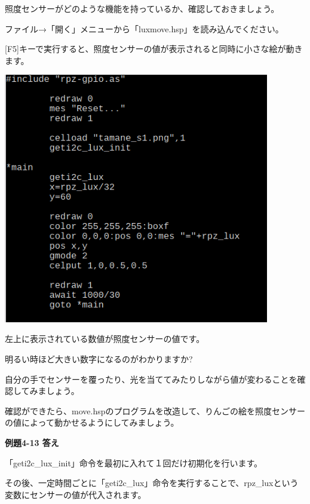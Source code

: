 \documentclass[a4paper,12pt]{jarticle}
\begin{document}
照度センサーがどのような機能を持っているか、確認しておきましょう。


\bigskip

ファイル→「開く」メニューから「luxmove.hsp」を読み込んでください。

[F5]キーで実行すると、照度センサーの値が表示されると同時に小さな絵が動きます。

\bigskip
\bigskip

\begin{minipage}{9.781cm}
\centering
{\upshape
\includegraphics[keepaspectratio,width=11.615cm,height=10.94cm]{text04-img/text04-img040.png}}
\end{minipage}

\bigskip
\bigskip
\bigskip

左上に表示されている数値が照度センサーの値です。

明るい時ほど大きい数字になるのがわかりますか?

自分の手でセンサーを覆ったり、光を当ててみたりしながら値が変わることを確認してみましょう。


\bigskip

確認ができたら、move.hspのプログラムを改造して、りんごの絵を照度センサーの値によって動かせるようにしてみましょう。


\bigskip

{\bfseries
例題4-13 答え}


\bigskip

「geti2c\_lux\_init」命令を最初に入れて１回だけ初期化を行います。

その後、一定時間ごとに「geti2c\_lux」命令を実行することで、rpz\_luxという変数にセンサーの値が代入されます。
\end{document}
